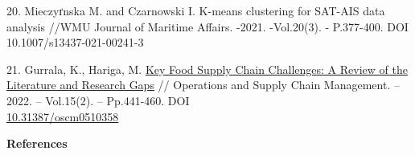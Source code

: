 \begin{references}
20. Mieczyґnska M. and Czarnowski I. K-means clustering for SAT-AIS data
analysis //WMU Journal of Maritime Affairs. -2021. -Vol.20(3). -
P.377-400. DOI 10.1007/s13437-021-00241-3

21. Gurrala, K., Hariga, M.
\href{https://journal.oscm-forum.org/publication/article/key-food-supply-chain-challenges-a-review-of-the-literature-and-research-gaps}{Key
Food Supply Chain Challenges: A Review of the Literature and Research
Gaps} // Operations and Supply Chain Management. -- 2022. -- Vol.15(2).
-- Pp.441-460. DOI\\
\href{http://doi.org/10.31387/oscm0510358}{10.31387/oscm0510358}
\end{references}

\begin{center}
{\bfseries References}
\end{center}

